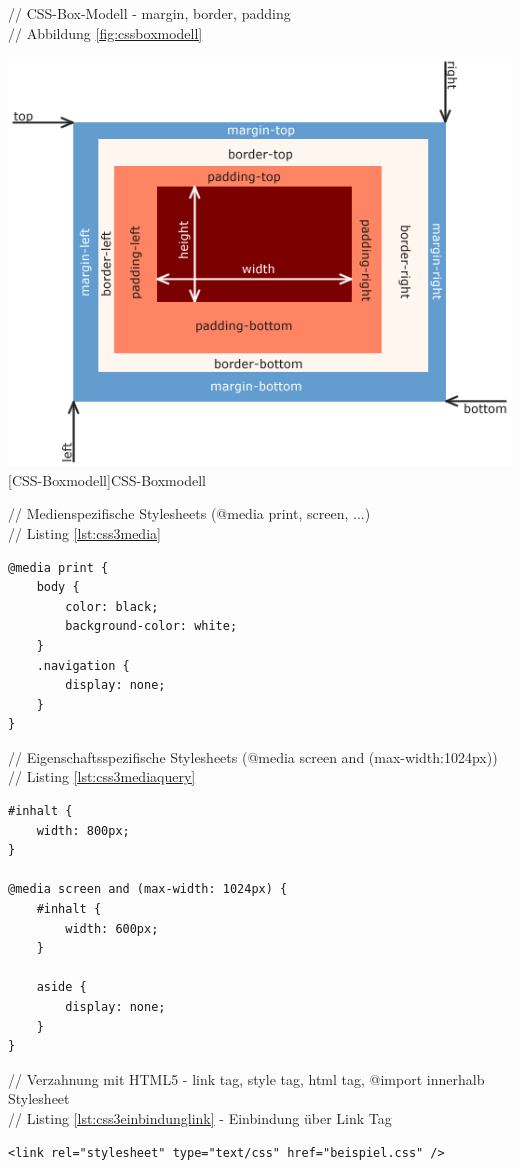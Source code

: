 \documentclass[12pt,a4paper,bibliography=totocnumbered,listof=totocnumbered]{scrartcl}
\begin{document}
// CSS-Box-Modell - margin, border, padding\\
// Abbildung \ref{fig:cssboxmodell}\\
	\vspace{1em}
	\begin{minipage}{\linewidth}
		\centering
		\includegraphics[width=0.7\linewidth]{images/css_boxmodell.png}
		[CSS-Boxmodell]{CSS-Boxmodell\footnotemark }
		\label{fig:cssboxmodell}
	\end{minipage}
	
// Medienspezifische Stylesheets (@media print, screen, ...)\\
// Listing \ref{lst:css3media}
	\vspace{1em}
	\begin{lstlisting}[caption=CSS3 medienspezifisches Stylesheet, label=lst:css3media]
@media print {
	body {
		color: black;
		background-color: white;
	}
	.navigation {
		display: none;
	}
}
	\end{lstlisting}

// Eigenschaftsspezifische Stylesheets (@media screen and (max-width:1024px))\\
// Listing \ref{lst:css3mediaquery}
	\vspace{1em}
	\begin{lstlisting}[caption=CSS3 eigenschaftsspezifisches Stylesheet, label=lst:css3mediaquery]
#inhalt {
	width: 800px;
}
 
@media screen and (max-width: 1024px) {
	#inhalt {
		width: 600px;
	}
 
	aside {
		display: none;
	}
}
	\end{lstlisting}
	
// Verzahnung mit HTML5 - link tag, style tag, html tag, @import innerhalb Stylesheet\\
// Listing \ref{lst:css3einbindunglink} - Einbindung über Link Tag
	\vspace{1em}
	\begin{lstlisting}[caption=Stylesheet Einbindung über Link Tag, label=lst:css3einbindunglink]
<link rel="stylesheet" type="text/css" href="beispiel.css" />
	\end{lstlisting}
	
\end{document}
